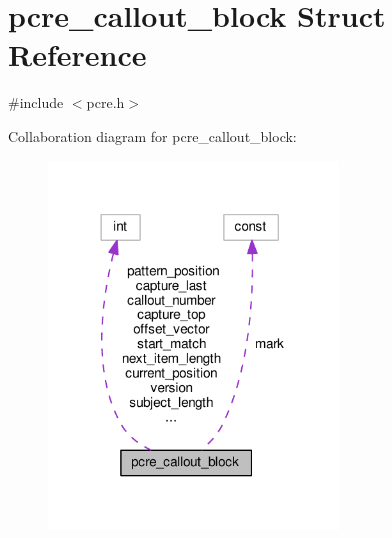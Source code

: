 \hypertarget{structpcre__callout__block}{}\section{pcre\+\_\+callout\+\_\+block Struct Reference}
\label{structpcre__callout__block}


{\ttfamily \#include $<$pcre.\+h$>$}



Collaboration diagram for pcre\+\_\+callout\+\_\+block\+:
\nopagebreak
\begin{figure}[H]
\begin{center}
\leavevmode
\includegraphics[width=218pt]{structpcre__callout__block__coll__graph}
\end{center}
\end{figure}
